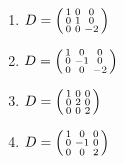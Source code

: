 \documentclass[../practica.root.tex]{subfiles}
\begin{document}
\begin{enumerate}
          \begin{enumerate}
              \item $D=\begin{psmallmatrix}1&0&0\\0&1&0\\0&0&-2\end{psmallmatrix}$
              \item $D=\begin{psmallmatrix}1&0&0\\0&-1&0\\0&0&-2\end{psmallmatrix}$
              \item $D=\begin{psmallmatrix}1&0&0\\0&2&0\\0&0&2\end{psmallmatrix}$
              \item $D=\begin{psmallmatrix}1&0&0\\0&-1&0\\0&0&2\end{psmallmatrix}$
          \end{enumerate}
\end{enumerate}
\end{document}
